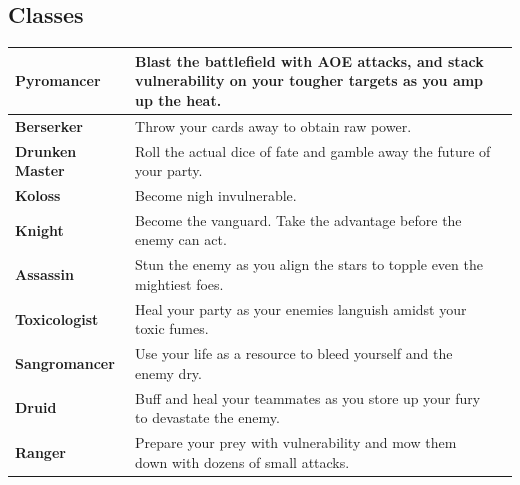 \subsection*{Classes}

\begin{longtable}{|p{3.5cm}|p{12.2cm}|p{0.5cm}|}
	
	
	\hline
	\textbf{Pyromancer} \symFire&  Blast the battlefield with AOE attacks, and stack vulnerability on your tougher targets as you amp up the heat.& \symVulnerable\\
	\hline
	\textbf{Berserker} \symFire \symEarth&  Throw your cards away to obtain raw power.& \symBlaze\\
	\hline
	\textbf{Drunken Master} \symEarth&  Roll the actual dice of fate and gamble away the future of your party.& \symDSix\\
	\hline
	\textbf{Koloss} \symEarth \symMetal&  Become nigh invulnerable.& \symShield\\
	\hline
	\textbf{Knight} \symMetal&  Become the vanguard. Take the advantage before the enemy can act.& \symAdvantage\\
	\hline
	\textbf{Assassin} \symMetal \symWater&  Stun the enemy as you align the stars to topple even the mightiest foes.& \symStun\\
	\hline
	\textbf{Toxicologist} \symWater&  Heal your party as your enemies languish amidst your toxic fumes.& \symPoison\\
	\hline
	\textbf{Sangromancer} \symWater \symWood&  Use your life as a resource to bleed yourself and the enemy dry.& \symHeal\\%
	\hline
	\textbf{Druid} \symWood&  Buff and heal your teammates as you store up your fury to devastate the enemy.& \symPowerful\\
	\hline
	\textbf{Ranger} \symWood \symFire&  Prepare your prey with vulnerability and mow them down with dozens of small attacks.& \symFlurry\\
	\hline
\end{longtable}


